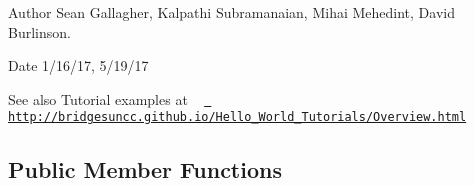 \begin{DoxyAuthor}{Author}
Sean Gallagher, Kalpathi Subramanaian, Mihai Mehedint, David Burlinson.
\end{DoxyAuthor}
\begin{DoxyDate}{Date}
1/16/17, 5/19/17
\end{DoxyDate}
\begin{DoxySeeAlso}{See also}
Tutorial examples at ~\newline
 \href{http://bridgesuncc.github.io/Hello_World_Tutorials/Overview.html}{\texttt{ http\+://bridgesuncc.\+github.\+io/\+Hello\+\_\+\+World\+\_\+\+Tutorials/\+Overview.\+html}} 
\end{DoxySeeAlso}
\subsection*{Public Member Functions}

